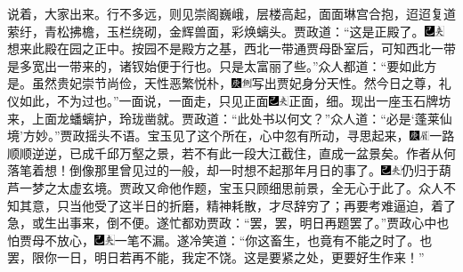 说着，大家出来。行不多远，则见崇阁巍峨，层楼高起，面面琳宫合抱，迢迢复道萦纡，青松拂檐，玉栏绕砌，金辉兽面，彩焕螭头。贾政道：“这是正殿了。{\includegraphics[width=3mm]{../Images/00003}\includegraphics[width=3mm]{../Images/00012}\footnotesize \kaishu 想来此殿在园之正中。按园不是殿方之基，西北一带通贾母卧室后，可知西北一带是多宽出一带来的，诸钗始便于行也。}只是太富丽了些。”众人都道：“要如此方是。虽然贵妃崇节尚俭，天性恶繁悦朴，{\includegraphics[width=3mm]{../Images/00004}\includegraphics[width=3mm]{../Images/00011}\footnotesize \kaishu 写出贾妃身分天性。}然今日之尊，礼仪如此，不为过也。”一面说，一面走，只见正面{\includegraphics[width=3mm]{../Images/00003}\includegraphics[width=3mm]{../Images/00012}\footnotesize \kaishu 正面，细。}现出一座玉石牌坊来，上面龙蟠螭护，玲珑凿就。贾政道：“此处书以何文？”众人道：“必是‘蓬莱仙境’方妙。”贾政摇头不语。宝玉见了这个所在，心中忽有所动，寻思起来，{\includegraphics[width=3mm]{../Images/00004}\includegraphics[width=3mm]{../Images/00010}\footnotesize \kaishu 一路顺顺逆逆，已成千邱万壑之景，若不有此一段大江截住，直成一盆景矣。作者从何落笔着想！}倒像那里曾见过的一般，却一时想不起那年月日的事了。{\includegraphics[width=3mm]{../Images/00003}\includegraphics[width=3mm]{../Images/00012}\footnotesize \kaishu 仍归于葫芦一梦之太虚玄境。}贾政又命他作题，宝玉只顾细思前景，全无心于此了。众人不知其意，只当他受了这半日的折磨，精神耗散，才尽辞穷了；再要考难逼迫，着了急，或生出事来，倒不便。遂忙都劝贾政：“罢，罢，明日再题罢了。”贾政心中也怕贾母不放心，{\includegraphics[width=3mm]{../Images/00003}\includegraphics[width=3mm]{../Images/00012}\footnotesize \kaishu 一笔不漏。}遂冷笑道：“你这畜生，也竟有不能之时了。也罢，限你一日，明日若再不能，我定不饶。这是要紧之处，更要好生作来！”

